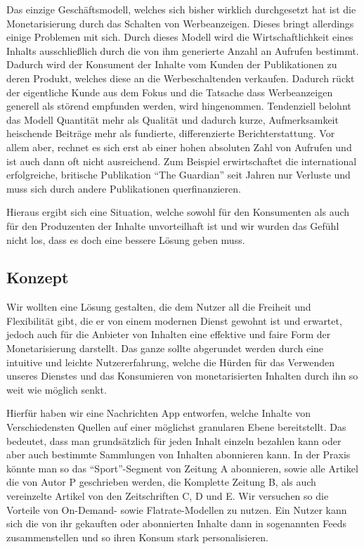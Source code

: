 Das einzige Geschäftsmodell, welches sich bisher wirklich durchgesetzt hat ist die Monetarisierung durch das Schalten von Werbeanzeigen. Dieses bringt allerdings einige Problemen mit sich. Durch dieses Modell wird die Wirtschaftlichkeit eines Inhalts ausschließlich durch die von ihm generierte Anzahl an Aufrufen bestimmt. Dadurch wird der Konsument der Inhalte vom Kunden der Publikationen zu deren Produkt, welches diese an die Werbeschaltenden verkaufen. Dadurch rückt der eigentliche Kunde aus dem Fokus und die Tatsache dass Werbeanzeigen generell als störend empfunden werden, wird hingenommen. Tendenziell belohnt das Modell Quantität mehr als Qualität und dadurch kurze, Aufmerksamkeit heischende Beiträge mehr als fundierte, differenzierte Berichterstattung. Vor allem aber, rechnet es sich erst ab einer hohen absoluten Zahl von Aufrufen und ist auch dann oft nicht ausreichend. Zum Beispiel erwirtschaftet die international erfolgreiche, britische Publikation \enquote{The Guardian} seit Jahren nur Verluste und muss sich durch andere Publikationen querfinanzieren.

Hieraus ergibt sich eine Situation, welche sowohl für den Konsumenten als auch für den Produzenten der Inhalte unvorteilhaft ist und wir wurden das Gefühl nicht los, dass es doch eine bessere Lösung geben muss.

\subsection{Konzept}

Wir wollten eine Lösung gestalten, die dem Nutzer all die Freiheit und Flexibilität gibt, die er von einem modernen Dienst gewohnt ist und erwartet, jedoch auch für die Anbieter von Inhalten eine effektive und faire Form der Monetarisierung darstellt. Das ganze sollte abgerundet werden durch eine intuitive und leichte Nutzererfahrung, welche die Hürden für das Verwenden unseres Dienstes und das Konsumieren von monetarisierten Inhalten durch ihn so weit wie möglich senkt.

Hierfür haben wir eine Nachrichten App entworfen, welche Inhalte von Verschiedensten Quellen auf einer möglichst granularen Ebene bereitstellt. Das bedeutet, dass man grundsätzlich für jeden Inhalt einzeln bezahlen kann oder aber auch bestimmte Sammlungen von Inhalten abonnieren kann. In der Praxis könnte man so das \enquote{Sport}-Segment von Zeitung A abonnieren, sowie alle Artikel die von Autor P geschrieben werden, die Komplette Zeitung B, als auch vereinzelte Artikel von den Zeitschriften C, D und E. Wir versuchen so die Vorteile von On-Demand- sowie Flatrate-Modellen zu nutzen. Ein Nutzer kann sich die von ihr gekauften oder abonnierten Inhalte dann in sogenannten Feeds zusammenstellen und so ihren Konsum stark personalisieren.

